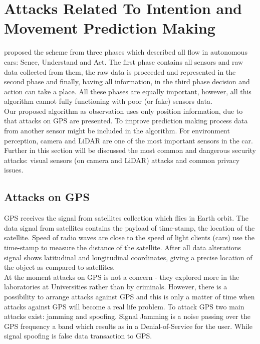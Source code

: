 \section{Attacks Related To Intention and Movement Prediction Making}

\cite{AttacksOnSensors} proposed the scheme from three phases which described all flow in autonomous cars: Sence, Understand and Act. The first phase contains all sensors and raw data collected from them, the raw data is proceeded and represented in the second phase and finally, having all information, in the third phase decision and action can take a place. All these phases are equally important, however, all this algorithm cannot fully functioning with poor (or fake) sensors data. \\
Our proposed algorithm as observation uses only position information, due to that attacks on \gls{GPS} are presented. To improve prediction making process data from another sensor might be included in the algorithm. For environment perception, camera and \gls{LiDAR} are one of the most important sensors in the car. Further in this section will be discussed the most common and dangerous security attacks: visual sensors (on camera and \gls{LiDAR}) attacks and common privacy issues.

\subsection{Attacks on \gls{GPS}}

\gls{GPS} receives the signal from satellites collection which flies in Earth orbit. The data signal from satellites contains the payload of time-stamp, the location of the satellite. Speed of radio waves are close to the speed of light clients (cars) use the time-stamp to measure the distance of the satellite. After all data alterations signal shows latitudinal and longitudinal coordinates, giving a precise location of the object as compared to satellites. \\
At the moment attacks on \gls{GPS} is not a concern - they explored more in the laboratories at Universities rather than by criminals. However, there is a possibility to arrange attacks against \gls{GPS} and this is only a matter of time when attacks against \gls{GPS} will become a real life problem. To attack \gls{GPS} two main attacks exist: jamming and spoofing. Signal Jamming is a noise passing over the \gls{GPS} frequency a band which results as in a Denial-of-Service for the user. While signal spoofing is false data transaction to \gls{GPS}.

